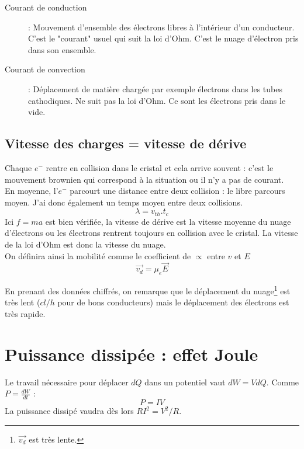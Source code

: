 \documentclass[11pt, a4paper, openany]{book}
\begin{document}
		
		\begin{description}
			\item[Courant de conduction] : Mouvement d'ensemble des électrons libres à l'intérieur d'un conducteur. C'est le "courant" usuel qui suit la loi d'Ohm. C'est le nuage d'électron pris dans son ensemble.
			\item[Courant de convection] : Déplacement de matière chargée par exemple électrons dans les tubes cathodiques. Ne suit pas la loi d'Ohm. Ce sont les électrons pris dans le vide.
		\end{description}
		
		
		\subsection{Vitesse des charges = vitesse de dérive}
		Chaque $e^-$ rentre en collision dans le cristal et cela arrive souvent : c'est le mouvement brownien qui correspond à la situation ou il n'y a pas de courant. \\
		En moyenne, l'$e^-$ parcourt une distance entre deux collision : le libre parcours moyen. J'ai donc également un temps moyen entre deux collisions.
		\begin{equation}
		\lambda = v_{th}.t_c
		\end{equation}
		Ici $f=ma$ est bien vérifiée, la vitesse de dérive est la vitesse moyenne du nuage d'électrons ou les électrons rentrent toujours en collision avec le cristal. La vitesse de la loi d'Ohm est donc la vitesse du nuage.\\
		On définira ainsi la mobilité comme le coefficient de $\propto$ entre $v$ et $E$
		\begin{equation}
		\vec{v_d} = \mu_e\vec{E}
		\end{equation}
		
		En prenant des données chiffrés, on remarque que le déplacement du nuage\footnote{$\vec{v_d}$ est très lente.} est très lent ($cl/h$ pour de bons conducteurs) mais le déplacement des électrons est très rapide.
		
		\section{Puissance dissipée : effet Joule}
		Le travail nécessaire pour déplacer $dQ$ dans un potentiel vaut $dW = V dQ$. Comme $P = \frac{dW}{dt}$ :
		\begin{equation}
		P = IV
		\end{equation}
		La puissance dissipé vaudra dès lors $RI^2 = V^2/R$.\\
		
\end{document}
